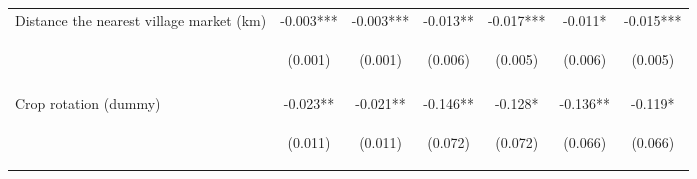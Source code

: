 \begin{center}
\begin{tabular}{lcccccc}
Distance the nearest village market (km) & -0.003*** & -0.003*** & -0.013** & -0.017*** & -0.011* & -0.015*** \\
 & \begin{footnotesize}(0.001)\end{footnotesize} & \begin{footnotesize}(0.001)\end{footnotesize} & \begin{footnotesize}(0.006)\end{footnotesize} & \begin{footnotesize}(0.005)\end{footnotesize} & \begin{footnotesize}(0.006)\end{footnotesize} & \begin{footnotesize}(0.005)\end{footnotesize} \\
\vspace{4pt} & \begin{footnotesize}[0.003]\end{footnotesize} & \begin{footnotesize}[0.000]\end{footnotesize} & \begin{footnotesize}[0.044]\end{footnotesize} & \begin{footnotesize}[0.002]\end{footnotesize} & \begin{footnotesize}[0.053]\end{footnotesize} & \begin{footnotesize}[0.002]\end{footnotesize} \\
Crop rotation (dummy) & -0.023** & -0.021** & -0.146** & -0.128* & -0.136** & -0.119* \\
 & \begin{footnotesize}(0.011)\end{footnotesize} & \begin{footnotesize}(0.011)\end{footnotesize} & \begin{footnotesize}(0.072)\end{footnotesize} & \begin{footnotesize}(0.072)\end{footnotesize} & \begin{footnotesize}(0.066)\end{footnotesize} & \begin{footnotesize}(0.066)\end{footnotesize} \\

\end{tabular}
\end{center}
